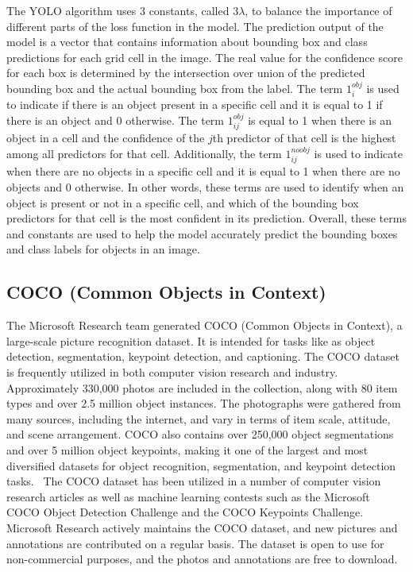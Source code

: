 \documentclass[11pt, a4paper, openany]{book}
\begin{document}
The YOLO algorithm uses 3 constants, called $3 \lambda$, to balance the importance of different parts of the loss function in the model. The prediction output of the model is a vector that contains information about bounding box and class predictions for each grid cell in the image. The real value for the confidence score for each box is determined by the intersection over union of the predicted bounding box and the actual bounding box from the label. The term $1_i^{o b j}$ is used to indicate if there is an object present in a specific cell and it is equal to 1 if there is an object and 0 otherwise. The term $1_{i j}^{o b j}$ is equal to 1 when there is an object in a cell and the confidence of the $j$th predictor of that cell is the highest among all predictors for that cell.\newline
Additionally, the term $1_{i j}^{n o o b j}$ is used to indicate when there are no objects in a specific cell and it is equal to 1 when there are no objects and 0 otherwise. In other words, these terms are used to identify when an object is present or not in a specific cell, and which of the bounding box predictors for that cell is the most confident in its prediction. Overall, these terms and constants are used to help the model accurately predict the bounding boxes and class labels for objects in an image.
\subsection{COCO (Common Objects in Context)}
The Microsoft Research team generated COCO (Common Objects in Context), a large-scale picture recognition dataset. It is intended for tasks like as object detection, segmentation, keypoint detection, and captioning. The COCO dataset is frequently utilized in both computer vision research and industry.\newline
Approximately 330,000 photos are included in the collection, along with 80 item types and over 2.5 million object instances. The photographs were gathered from many sources, including the internet, and vary in terms of item scale, attitude, and scene arrangement. COCO also contains over 250,000 object segmentations and over 5 million object keypoints, making it one of the largest and most diversified datasets for object recognition, segmentation, and keypoint detection tasks.~\cite{lin2014microsoft}\newline
The COCO dataset has been utilized in a number of computer vision research articles as well as machine learning contests such as the Microsoft COCO Object Detection Challenge and the COCO Keypoints Challenge. Microsoft Research actively maintains the COCO dataset, and new pictures and annotations are contributed on a regular basis. The dataset is open to use for non-commercial purposes, and the photos and annotations are free to download.\newline
\end{document}
